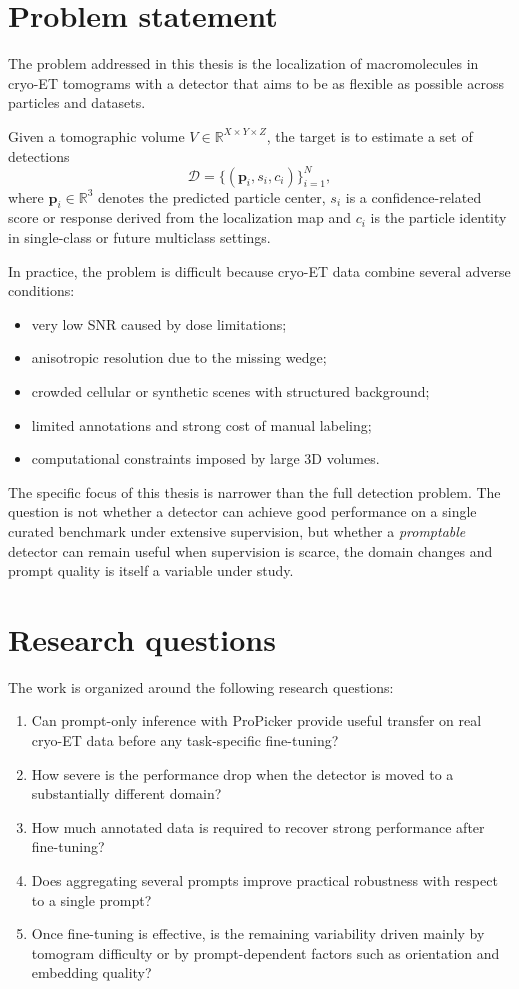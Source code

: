 \documentclass[12pt,a4paper]{report}
\begin{document}
\section{Problem statement}
The problem addressed in this thesis is the localization of macromolecules in cryo-ET tomograms with a detector that aims to be as flexible as possible across particles and datasets.

Given a tomographic volume \(V \in \mathbb{R}^{X \times Y \times Z}\), the target is to estimate a set of detections
\[
\mathcal{D}=\{(\mathbf{p}_i,s_i,c_i)\}_{i=1}^{N},
\]
where \(\mathbf{p}_i \in \mathbb{R}^3\) denotes the predicted particle center, \(s_i\) is a confidence-related score or response derived from the localization map and \(c_i\) is the particle identity in single-class or future multiclass settings.

In practice, the problem is difficult because cryo-ET data combine several adverse conditions:
\begin{itemize}
  \item very low SNR caused by dose limitations;
  \item anisotropic resolution due to the missing wedge;
  \item crowded cellular or synthetic scenes with structured background;
  \item limited annotations and strong cost of manual labeling;
  \item computational constraints imposed by large 3D volumes.
\end{itemize}

The specific focus of this thesis is narrower than the full detection problem. The question is not whether a detector can achieve good performance on a single curated benchmark under extensive supervision, but whether a \emph{promptable} detector can remain useful when supervision is scarce, the domain changes and prompt quality is itself a variable under study.

\section{Research questions}
The work is organized around the following research questions:
\begin{enumerate}
  \item Can prompt-only inference with ProPicker provide useful transfer on real cryo-ET data before any task-specific fine-tuning?
  \item How severe is the performance drop when the detector is moved to a substantially different domain?
  \item How much annotated data is required to recover strong performance after fine-tuning?
  \item Does aggregating several prompts improve practical robustness with respect to a single prompt?
  \item Once fine-tuning is effective, is the remaining variability driven mainly by tomogram difficulty or by prompt-dependent factors such as orientation and embedding quality?
\end{enumerate}
\end{document}
